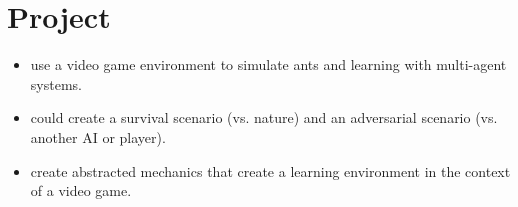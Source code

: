 
\chapter{Project}
\label{ch:Project}

\begin{itemize}[noitemsep,nolistsep]
	\item use a video game environment to simulate ants and learning with multi-agent systems.
	\item could create a survival scenario (vs. nature) and an adversarial scenario (vs. another AI or player).
	\item create abstracted mechanics that create a learning environment in the context of a video game.
\end{itemize}